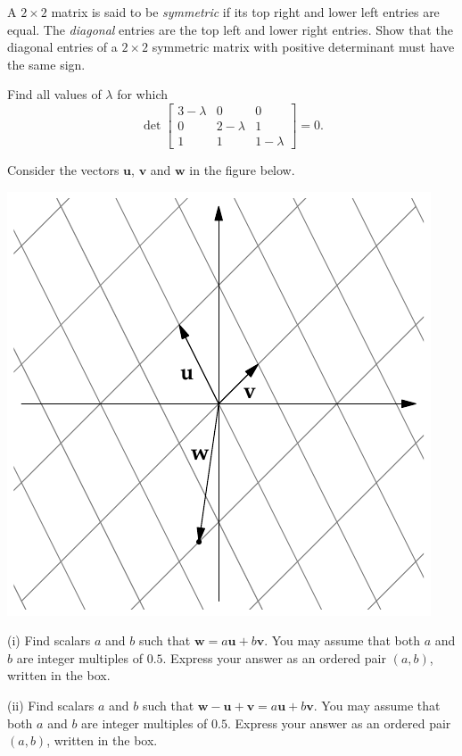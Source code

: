 \documentclass{watsonbook}
\begin{document}
\begin{aexercise}
  A $2\times 2$ matrix is said to be \textit{symmetric} if its top
  right and lower left entries are equal. The \textit{diagonal}
  entries are the top left and lower right entries. Show that the
  diagonal entries of a $2\times 2$
  symmetric matrix with positive determinant must have the same sign. 
\end{aexercise}

\begin{aexercise}
  Find all values of $\lambda$ for which 
\[
\det \left[
\begin{array}{ccc}
3 - \lambda & 0 & 0 \\
0 & 2-\lambda & 1 \\
1 & 1 & 1 - \lambda
\end{array}
\right]
= 0. 
\]
\end{aexercise}

\newpage 


\begin{aexercise}
Consider the vectors $\mathbf{u}$, $\mathbf{v}$ and $\mathbf{w}$ in the figure below. 

\begin{center}
  \includegraphics{exercisefigures/parallelogram}
\end{center}

(i) Find scalars $a$ and $b$ such that $\mathbf{w} = a\mathbf{u} + b\mathbf{v}$. You may assume that both $a$ and $b$ are integer multiples of $0.5$. Express your answer as an ordered pair $(a,b)$, written in the box. 

(ii) Find scalars $a$ and $b$ such that $\mathbf{w} - \mathbf{u} + \mathbf{v} = a\mathbf{u} + b\mathbf{v}$. You may assume that both $a$ and $b$ are integer multiples of $0.5$. Express your answer as an ordered pair $(a,b)$, written in the box. 
\end{aexercise}
\end{document}
